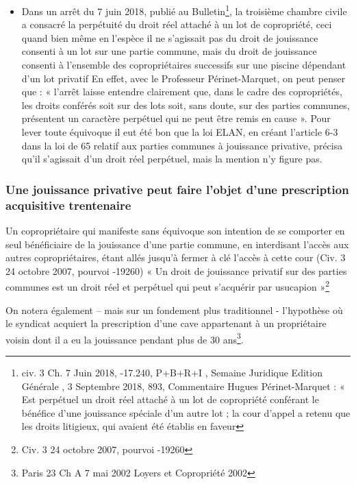 \begin{itemize}
				\item Dans un arrêt du 7 juin 2018, publié au Bulletin\footnote{civ. 3\degre{} Ch. 7 Juin 2018, -17.240, P+B+R+I , Semaine Juridique Edition Générale , 3 Septembre 2018, 893,	Commentaire Hugues Périnet-Marquet : « Est perpétuel un droit réel attaché à un lot de copropriété conférant le bénéfice	d'une jouissance spéciale d'un autre lot ; la cour d'appel a retenu que les droits litigieux, qui avaient été établis en faveur}, la troisième chambre civile a consacré la	perpétuité du droit réel attaché à un lot de copropriété, ceci quand bien même en l’espèce il ne s’agissait pas du droit de jouissance consenti à un lot sur une partie commune, mais du droit de
				jouissance consenti à l’ensemble des copropriétaires successifs sur une piscine dépendant d’un lot
				privatif En effet, avec le Professeur Périnet-Marquet, on peut penser que : « l’arrêt laisse entendre
				clairement que, dans le cadre des copropriétés, les droits conférés soit sur des lots soit, sans doute,
				sur des parties communes, présentent un caractère perpétuel qui ne peut être remis en cause ».
				Pour lever toute équivoque il eut été bon que la loi ELAN, en créant l’article 6-3 dans la loi de 65 relatif aux
				parties communes à jouissance privative, précisa qu’il s’agissait d’un droit réel perpétuel, mais la mention
				n’y figure pas.
			\end{itemize}
		
		\subsubsection{Une jouissance privative peut faire l’objet d’une prescription acquisitive trentenaire}
		
			Un copropriétaire qui manifeste sans équivoque son intention de se comporter en seul bénéficiaire de la
			jouissance d’une partie commune, en interdisant l’accès aux autres copropriétaires, étant allés jusqu’à
			fermer à clé l’accès à cette cour (Civ. 3\degre{} 24 octobre 2007, pourvoi -19260)
			« Un droit de jouissance privatif sur des parties communes est un droit réel et perpétuel qui peut
			s’acquérir par usucapion »\footnote{Civ. 3\degre{} 24 octobre 2007, pourvoi -19260}
			
			On notera également – mais sur un fondement plus traditionnel - l’hypothèse où le syndicat acquiert la
			prescription d’une cave appartenant à un propriétaire voisin dont il a eu la jouissance pendant plus de 30
			ans\footnote{Paris 23\degre{} Ch A 7 mai 2002 Loyers et Copropriété 2002 }.
			
